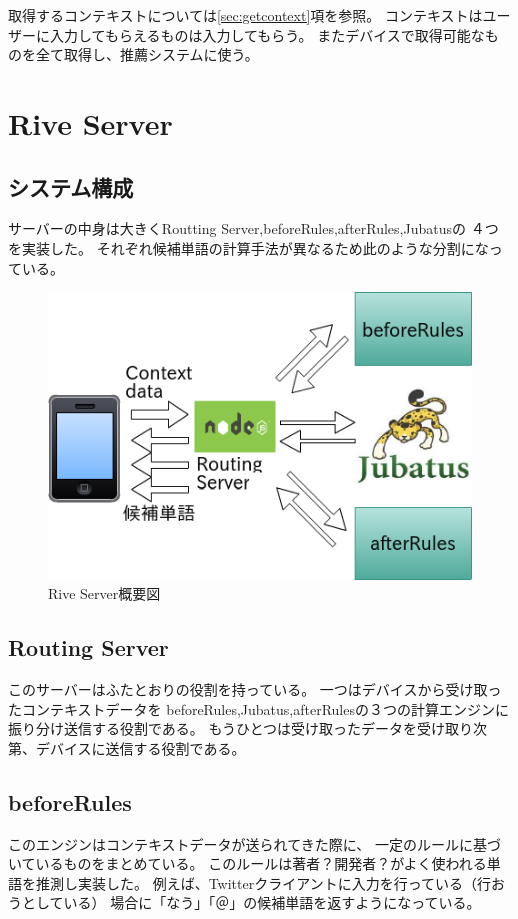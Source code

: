 取得するコンテキストについては\ref{sec:getcontext}項を参照。
コンテキストはユーザーに入力してもらえるものは入力してもらう。
またデバイスで取得可能なものを全て取得し、推薦システムに使う。

\section{Rive Server}
\subsection{システム構成}

サーバーの中身は大きくRoutting Server,beforeRules,afterRules,Jubatusの
４つを実装した。
それぞれ候補単語の計算手法が異なるため此のような分割になっている。
\begin{figure}[htbp]
  \begin{center}
    \includegraphics[width=14cm,bb=0 0 466 316]{images/riveserver.png}
  \end{center}
  \caption{Rive Server概要図}
  \label{fig:riveserver}
\end{figure}

\subsection{Routing Server}
このサーバーはふたとおりの役割を持っている。
一つはデバイスから受け取ったコンテキストデータを
beforeRules,Jubatus,afterRulesの３つの計算エンジンに振り分け送信する役割である。
もうひとつは受け取ったデータを受け取り次第、デバイスに送信する役割である。

\subsection{beforeRules}
このエンジンはコンテキストデータが送られてきた際に、
一定のルールに基づいているものをまとめている。
このルールは著者？開発者？がよく使われる単語を推測し実装した。
例えば、Twitter\cite{Twitter}クライアントに入力を行っている（行おうとしている）
場合に「なう」「＠」の候補単語を返すようになっている。

